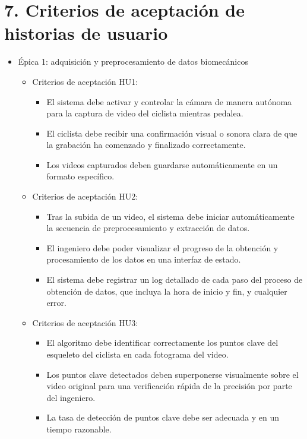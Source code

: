 \documentclass[
11pt, %
]{charter}
\begin{document}
\section{7. Criterios de aceptación de historias de usuario}
\label{sec:criteriosAceptacion}

\begin{itemize}
  \item Épica 1: adquisición y preprocesamiento de datos biomecánicos
    \begin{itemize}
      \item Criterios de aceptación HU1:
        \begin{itemize}
          \item El sistema debe activar y controlar la cámara de manera autónoma para la captura de video del ciclista mientras pedalea.
          \item El ciclista debe recibir una confirmación visual o sonora clara de que la grabación ha comenzado y finalizado correctamente.
          \item Los videos capturados deben guardarse automáticamente en un formato específico.
        \end{itemize}
      \item Criterios de aceptación HU2:
        \begin{itemize}
          \item Tras la subida de un video, el sistema debe iniciar automáticamente la secuencia de preprocesamiento y extracción de datos.
          \item El ingeniero debe poder visualizar el progreso de la obtención y procesamiento de los datos en una interfaz de estado.
          \item El sistema debe registrar un log detallado de cada paso del proceso de obtención de datos, que incluya la hora de inicio y fin, y cualquier error.
        \end{itemize}
      \item Criterios de aceptación HU3:
        \begin{itemize}
          \item El algoritmo debe identificar correctamente los puntos clave del esqueleto del ciclista en cada fotograma del video.
          \item Los puntos clave detectados deben superponerse visualmente sobre el video original para una verificación rápida de la precisión por parte del ingeniero.
          \item La tasa de detección de puntos clave debe ser adecuada y en un tiempo razonable.

\end{itemize}
\end{itemize}
\end{itemize}
\end{document}
